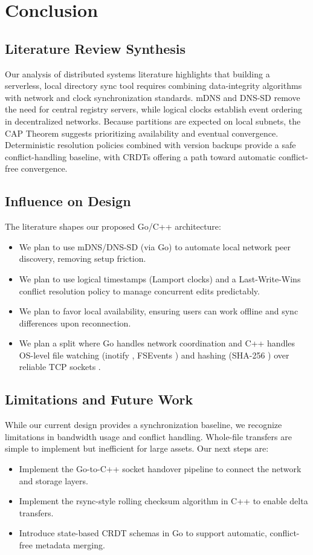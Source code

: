 \section{Conclusion}

\subsection{Literature Review Synthesis}
Our analysis of distributed systems literature highlights that building a serverless, local directory sync tool requires combining data-integrity algorithms with network and clock synchronization standards. mDNS and DNS-SD \cite{rfc6762, rfc6763} remove the need for central registry servers, while logical clocks \cite{lamport1978} establish event ordering in decentralized networks. Because partitions are expected on local subnets, the CAP Theorem \cite{brewer2002} suggests prioritizing availability and eventual convergence. Deterministic resolution policies combined with version backups \cite{bayou1995} provide a safe conflict-handling baseline, with CRDTs \cite{shapiro2011} offering a path toward automatic conflict-free convergence.

\subsection{Influence on Design}
The literature shapes our proposed Go/C++ architecture:
\begin{itemize}
    \item We plan to use mDNS/DNS-SD (via Go) to automate local network peer discovery, removing setup friction.
    \item We plan to use logical timestamps (Lamport clocks) and a Last-Write-Wins conflict resolution policy to manage concurrent edits predictably.
    \item We plan to favor local availability, ensuring users can work offline and sync differences upon reconnection.
    \item We plan a split where Go handles network coordination and C++ handles OS-level file watching (inotify \cite{inotify7}, FSEvents \cite{fsevents}) and hashing (SHA-256 \cite{fips1804}) over reliable TCP sockets \cite{rfc9293}.
\end{itemize}

\subsection{Limitations and Future Work}
While our current design provides a synchronization baseline, we recognize limitations in bandwidth usage and conflict handling. Whole-file transfers are simple to implement but inefficient for large assets. Our next steps are:
\begin{itemize}
    \item Implement the Go-to-C++ socket handover pipeline to connect the network and storage layers.
    \item Implement the rsync-style rolling checksum algorithm \cite{rsync1996} in C++ to enable delta transfers.
    \item Introduce state-based CRDT schemas \cite{shapiro2011} in Go to support automatic, conflict-free metadata merging.
\end{itemize}

